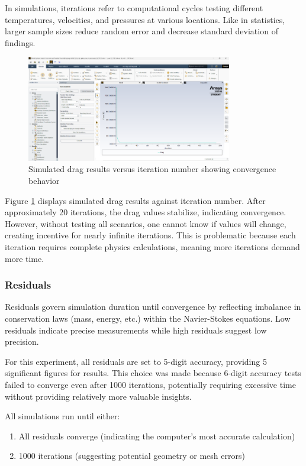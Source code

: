 \documentclass[12pt,a4paper]{article}
\begin{document}
In simulations, iterations refer to computational cycles testing different temperatures, velocities, and pressures at various locations. Like in statistics, larger sample sizes reduce random error and decrease standard deviation of findings.

\begin{figure}[H]
    \centering
    \includegraphics[width=0.8\textwidth]{image8.png}
    \caption{Simulated drag results versus iteration number showing convergence behavior}
    \label{fig:convergence}
\end{figure}

Figure \ref{fig:convergence} displays simulated drag results against iteration number. After approximately 20 iterations, the drag values stabilize, indicating convergence. However, without testing all scenarios, one cannot know if values will change, creating incentive for nearly infinite iterations. This is problematic because each iteration requires complete physics calculations, meaning more iterations demand more time.

\subsubsection{Residuals}

Residuals govern simulation duration until convergence by reflecting imbalance in conservation laws (mass, energy, etc.) within the Navier-Stokes equations. Low residuals indicate precise measurements while high residuals suggest low precision.

For this experiment, all residuals are set to 5-digit accuracy, providing 5 significant figures for results. This choice was made because 6-digit accuracy tests failed to converge even after 1000 iterations, potentially requiring excessive time without providing relatively more valuable insights.

All simulations run until either:
\begin{enumerate}
    \item All residuals converge (indicating the computer's most accurate calculation)
    \item 1000 iterations (suggesting potential geometry or mesh errors)
\end{enumerate}
\end{document}
